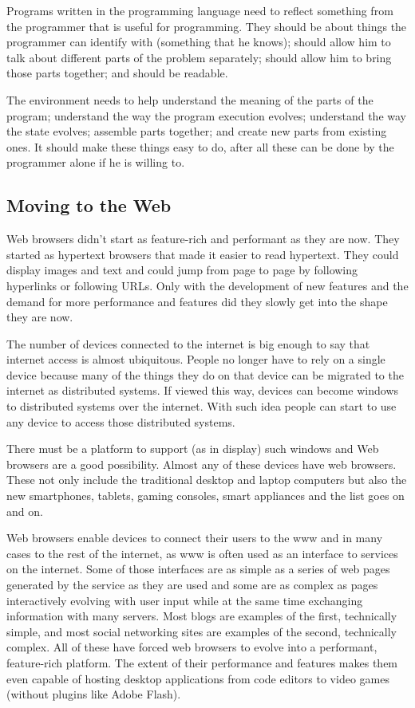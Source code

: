 \documentclass{./llncs2e/llncs}
\begin{document}
	Programs written in the programming language need to reflect something from the programmer that is useful for programming.
	They should be about things the programmer can identify with (something that he knows); should allow him to talk about different parts of the problem separately; should allow him to bring those parts together; and should be readable.
	
	The environment needs to help understand the meaning of the parts of the program; understand the way the program execution evolves; understand the way the state evolves; assemble parts together; and create new parts from existing ones.
	It should make these things easy to do, after all these can be done by the programmer alone if he is willing to.

\subsection{Moving to the Web}
	Web browsers didn't start as feature-rich and performant as they are now.
	They started as hypertext browsers that made it easier to read hypertext.
	They could display images and text and could jump from page to page by following hyperlinks or following URLs.
	Only with the development of new features and the demand for more performance and features did they slowly get into the shape they are now.

	The number of devices connected to the internet is big enough to say that internet access is almost ubiquitous.
	People no longer have to rely on a single device because many of the things they do on that device can be migrated to the internet as distributed systems.
	If viewed this way, devices can become windows to distributed systems over the internet.
	With such idea people can start to use any device to access those distributed systems.

	There must be a platform to support (as in display) such windows and Web browsers are a good possibility.
	Almost any of these devices have web browsers.
	These not only include the traditional desktop and laptop computers but also the new smartphones, tablets, gaming consoles, smart appliances and the list goes on and on.

	Web browsers enable devices to connect their users to the \ac{www} and in many cases to the rest of the internet, as \ac{www} is often used as an interface to services on the internet.
	Some of those interfaces are as simple as a series of web pages generated by the service as they are used and some are as complex as pages interactively evolving with user input while at the same time exchanging information with many servers.
	Most blogs are examples of the first, technically simple, and most social networking sites are examples of the second, technically complex.
	All of these have forced web browsers to evolve into a performant, feature-rich platform.
	The extent of their performance and features makes them even capable of hosting desktop applications from code editors to video games (without plugins like Adobe Flash).
\end{document}
